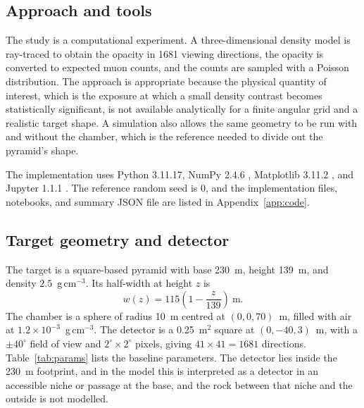 \documentclass{article}
\begin{document}
\subsection{Approach and tools}

The study is a computational experiment. A three-dimensional density model is
ray-traced to obtain the opacity in 1681 viewing directions, the opacity is
converted to expected muon counts, and the counts are sampled with a Poisson
distribution. The approach is appropriate because the physical quantity of
interest, which is the exposure at which a small density contrast becomes statistically
significant, is not available analytically for a finite angular grid and a
realistic target shape. A simulation also allows the same geometry to be run
with and without the chamber, which is the reference needed to divide out the
pyramid's shape.

\begin{sloppypar}
The implementation uses Python 3.11.17, NumPy 2.4.6 \cite{harris2020numpy},
Matplotlib 3.11.2 \cite{hunter2007matplotlib}, and Jupyter 1.1.1
\cite{kluyver2016jupyter}. The reference random seed is 0, and the
implementation files, notebooks, and summary JSON file are listed in
Appendix~\ref{app:code}.
\end{sloppypar}

\subsection{Target geometry and detector}

The target is a square-based pyramid with base 230~m, height 139~m, and
density $2.5$~g\,cm$^{-3}$. Its half-width at height $z$ is
\begin{equation}
w(z)=115\left(1-\frac{z}{139}\right)~\mathrm{m}.
\label{eq:width}
\end{equation}
The chamber is a sphere of radius 10~m centred at $(0,0,70)$~m, filled with air
at $1.2\times10^{-3}$~g\,cm$^{-3}$. The detector is a 0.25~m$^2$ square at
$(0,-40,3)$~m, with a $\pm40^\circ$ field of view and $2^\circ\times2^\circ$
pixels, giving $41\times41=1681$ directions. Table~\ref{tab:params} lists the
baseline parameters. The detector lies inside the 230~m footprint, and in the model
this is interpreted as a detector in an accessible niche or passage at the base,
and the rock between that niche and the outside is not modelled.
\end{document}
